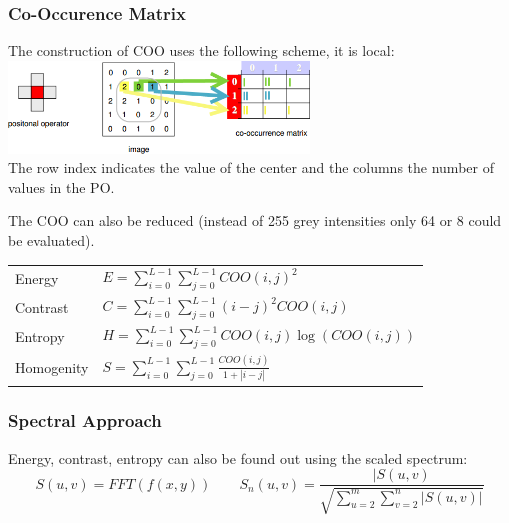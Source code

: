 \begin{minipage}{9cm}
      \subsubsection{Co-Occurence Matrix}
        The construction of COO uses the following scheme, it is local: \\
        \includegraphics[width=8cm]{./images/cooccurence_matrix.png} \\
        The row index indicates the value of the center
        and the columns the number of values in the PO.
        
        The COO can also be reduced (instead of 255 grey intensities only 64 or 8 could be evaluated).
        
        \begin{tabular}{ll}
          Energy
            & $E = \sum_{i=0}^{L-1} \sum_{j=0}^{L-1} COO(i,j)^2$ \\
          Contrast
            & $C = \sum_{i=0}^{L-1} \sum_{j=0}^{L-1} (i-j)^2 COO(i,j)$ \\
          Entropy
            & $H = \sum_{i=0}^{L-1} \sum_{j=0}^{L-1} COO(i,j) \log(COO(i,j))$ \\
          Homogenity
            & $S = \sum_{i=0}^{L-1} \sum_{j=0}^{L-1} \frac{COO(i,j)}{1+|i-j|}$ \\
        \end{tabular}
        
    \subsubsection{Spectral Approach}
      Energy, contrast, entropy can also be found out using the scaled spectrum:
      $$S(u,v) = FFT(f(x,y)) \qquad S_n(u,v) = \frac{|S(u,v)}{\sqrt{\sum\limits_{u=2}^{m} \sum\limits_{v=2}^n |S(u,v)|}}$$
  \end{minipage}
    
    